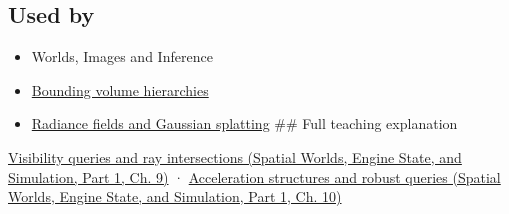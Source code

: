 \subsection{Used by}\label{appendix-47ac1bd6d144-used-by}

\hypertarget{appendix-47ac1bd6d144-used-by}{}

\begin{itemize}
\item
  {Worlds, Images and Inference}
\item
  \hyperref[appendix-0b426c47dd78]{Bounding volume hierarchies}
\item
  \hyperref[appendix-c5b332e400e7]{Radiance fields and Gaussian splatting} \#\# Full teaching explanation
\end{itemize}

\href{../05-Spatial-Worlds-Engine-State-and-Simulation-P01/main.pdf\#nameddest=04-visual-computing-ii-ch028-visibility-queries-and-ray-intersections-1}{Visibility queries and ray intersections (Spatial Worlds, Engine State, and Simulation, Part 1, Ch. 9)} · \href{../05-Spatial-Worlds-Engine-State-and-Simulation-P01/main.pdf\#nameddest=04-visual-computing-ii-ch029-acceleration-structures-and-robust-queries-1}{Acceleration structures and robust queries (Spatial Worlds, Engine State, and Simulation, Part 1, Ch. 10)}
